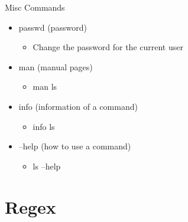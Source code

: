 \documentclass{beamer}
\begin{document}

\begin{frame}{Misc Commands}
\begin{itemize}
\item passwd (password)
\begin{itemize}
\item Change the password for the current user
\end{itemize}
\item man (manual pages)
\begin{itemize}
\item man ls
\end{itemize}
\item info (information of a command)
\begin{itemize}
\item info ls
\end{itemize}
\item --help (how to use a command)
\begin{itemize}
\item ls --help
\end{itemize}
\end{itemize}
\end{frame}

\section{Regex}
\subsection{}
\end{document}
